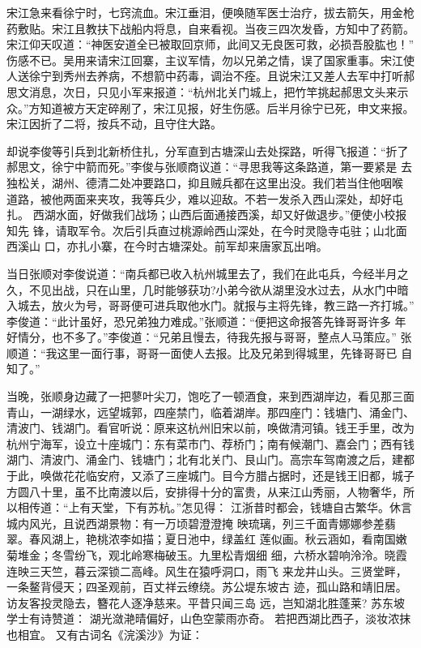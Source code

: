 宋江急来看徐宁时，七窍流血。宋江垂泪，便唤随军医士治疗，拔去箭矢，用金枪
药敷贴。宋江且教扶下战船内将息，自来看视。当夜三四次发昏，方知中了药箭。
宋江仰天叹道：“神医安道全已被取回京师，此间又无良医可救，必损吾股肱也！”
伤感不已。吴用来请宋江回寨，主议军情，勿以兄弟之情，误了国家重事。宋江使
人送徐宁到秀州去养病，不想箭中药毒，调治不痊。且说宋江又差人去军中打听郝
思文消息，次日，只见小军来报道：“杭州北关门城上，把竹竿挑起郝思文头来示
众。”方知道被方天定碎剐了，宋江见报，好生伤感。后半月徐宁已死，申文来报。
宋江因折了二将，按兵不动，且守住大路。

却说李俊等引兵到北新桥住扎，分军直到古塘深山去处探路，听得飞报道：“折了
郝思文，徐宁中箭而死。”李俊与张顺商议道：“寻思我等这条路道，第一要紧是
去独松关，湖州、德清二处冲要路口，抑且贼兵都在这里出没。我们若当住他咽喉
道路，被他两面来夹攻，我等兵少，难以迎敌。不若一发杀入西山深处，却好屯扎。
西湖水面，好做我们战场；山西后面通接西溪，却又好做退步。”便使小校报知先
锋，请取军令。次后引兵直过桃源岭西山深处，在今时灵隐寺屯驻；山北面西溪山
口，亦扎小寨，在今时古塘深处。前军却来唐家瓦出哨。

当日张顺对李俊说道：“南兵都已收入杭州城里去了，我们在此屯兵，今经半月之
久，不见出战，只在山里，几时能够获功?小弟今欲从湖里没水过去，从水门中暗
入城去，放火为号，哥哥便可进兵取他水门。就报与主将先锋，教三路一齐打城。”
李俊道：“此计虽好，恐兄弟独力难成。”张顺道：“便把这命报答先锋哥哥许多
年好情分，也不多了。”李俊道：“兄弟且慢去，待我先报与哥哥，整点人马策应。”
张顺道：“我这里一面行事，哥哥一面使人去报。比及兄弟到得城里，先锋哥哥已
自知了。”

当晚，张顺身边藏了一把蓼叶尖刀，饱吃了一顿酒食，来到西湖岸边，看见那三面
青山，一湖绿水，远望城郭，四座禁门，临着湖岸。那四座门：钱塘门、涌金门、
清波门、钱湖门。看官听说：原来这杭州旧宋以前，唤做清河镇。钱王手里，改为
杭州宁海军，设立十座城门：东有菜市门、荐桥门；南有候潮门、嘉会门；西有钱
湖门、清波门、涌金门、钱塘门；北有北关门、艮山门。高宗车驾南渡之后，建都
于此，唤做花花临安府，又添了三座城门。目今方腊占据时，还是钱王旧都，城子
方圆八十里，虽不比南渡以后，安排得十分的富贵，从来江山秀丽，人物奢华，所
以相传道：“上有天堂，下有苏杭。”怎见得：
江浙昔时都会，钱塘自古繁华。休言城内风光，且说西湖景物：有一万顷碧澄澄掩
映琉璃，列三千面青娜娜参差翡翠。春风湖上，艳桃浓李如描；夏日池中，绿盖红
莲似画。秋云涵如，看南国嫩菊堆金；冬雪纷飞，观北岭寒梅破玉。九里松青烟细
细，六桥水碧响泠泠。晓霞连映三天竺，暮云深锁二高峰。风生在猿呼洞口，雨飞
来龙井山头。三贤堂畔，一条鳌背侵天；四圣观前，百丈祥云缭绕。苏公堤东坡古
迹，孤山路和靖旧居。访友客投灵隐去，簪花人逐净慈来。平昔只闻三岛
远，岂知湖北胜蓬莱?
苏东坡学士有诗赞道：
湖光潋滟晴偏好，山色空蒙雨亦奇。
若把西湖比西子，淡妆浓抹也相宜。
又有古词名《浣溪沙》为证：

